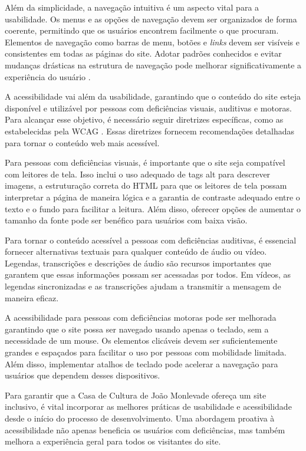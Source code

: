 Além da simplicidade, a navegação intuitiva é um aspecto vital para a usabilidade. Os menus e as opções de navegação devem ser organizados de forma coerente, permitindo que os usuários encontrem facilmente o que procuram. Elementos de navegação como barras de menu, botões e \textit{links} devem ser visíveis e consistentes em todas as páginas do site. Adotar padrões conhecidos e evitar mudanças drásticas na estrutura de navegação pode melhorar significativamente a experiência do usuário \cite{islam2016towards}.

A acessibilidade vai além da usabilidade, garantindo que o conteúdo do site esteja disponível e utilizável por pessoas com deficiências visuais, auditivas e motoras. Para alcançar esse objetivo, é necessário seguir diretrizes específicas, como as estabelecidas pela \ac{WCAG} \cite{wcag2020}. Essas diretrizes fornecem recomendações detalhadas para tornar o conteúdo web mais acessível.

Para pessoas com deficiências visuais, é importante que o site seja compatível com leitores de tela. Isso inclui o uso adequado de tags alt para descrever imagens, a estruturação correta do \ac{HTML} para que os leitores de tela possam interpretar a página de maneira lógica e a garantia de contraste adequado entre o texto e o fundo para facilitar a leitura. Além disso, oferecer opções de aumentar o tamanho da fonte pode ser benéfico para usuários com baixa visão.

Para tornar o conteúdo acessível a pessoas com deficiências auditivas, é essencial fornecer alternativas textuais para qualquer conteúdo de áudio ou vídeo. Legendas, transcrições e descrições de áudio são recursos importantes que garantem que essas informações possam ser acessadas por todos. Em vídeos, as legendas sincronizadas e as transcrições ajudam a transmitir a mensagem de maneira eficaz.

A acessibilidade para pessoas com deficiências motoras pode ser melhorada garantindo que o site possa ser navegado usando apenas o teclado, sem a necessidade de um mouse. Os elementos clicáveis devem ser suficientemente grandes e espaçados para facilitar o uso por pessoas com mobilidade limitada. Além disso, implementar atalhos de teclado pode acelerar a navegação para usuários que dependem desses dispositivos.

Para garantir que a Casa de Cultura de João Monlevade ofereça um site inclusivo, é vital incorporar as melhores práticas de usabilidade e acessibilidade desde o início do processo de desenvolvimento. Uma abordagem proativa à acessibilidade não apenas beneficia os usuários com deficiências, mas também melhora a experiência geral para todos os visitantes do site.

